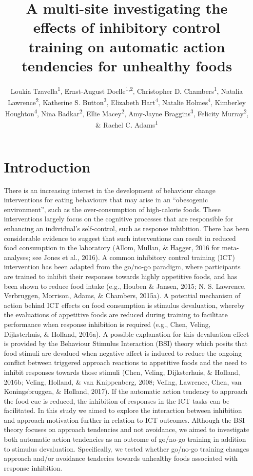 \documentclass[man,floatsintext]{apa6}
\title{A multi-site investigating the effects of inhibitory control training on
automatic action tendencies for unhealthy foods}
\author{Loukia Tzavella\textsuperscript{1}, Ernst-August
Doelle\textsuperscript{1,2}, Christopher D. Chambers\textsuperscript{1},
Natalia Lawrence\textsuperscript{2}, Katherine S.
Button\textsuperscript{3}, Elizabeth Hart\textsuperscript{4}, Natalie
Holmes\textsuperscript{4}, Kimberley Houghton\textsuperscript{4}, Nina
Badkar\textsuperscript{2}, Ellie Macey\textsuperscript{2}, Amy-Jayne
Braggins\textsuperscript{3}, Felicity Murray\textsuperscript{2}, \&
Rachel C. Adams\textsuperscript{1}}
\date{}
\affiliation{
\vspace{0.5cm}
\textsuperscript{1} Cardiff University Brain Research Imaging Centre, CF24 4HQ, UK\\\textsuperscript{2} School of Psychology, University of Exeter, EX4 4QG, UK\\\textsuperscript{3} Department of Psychology, University of Bath, BS2 7AY, UK\\\textsuperscript{4} School of Psychology, Cardiff University, CF10 3AT, UK}
\begin{document}
\maketitle

\section{Introduction}\label{introduction}

\par

There is an increasing interest in the development of behaviour change
interventions for eating behaviours that may arise in an
\enquote{obesogenic environment}, such as the over-consumption of
high-calorie foods. These interventions largely focus on the cognitive
processes that are responsible for enhancing an individual's
self-control, such as response inhibition. There has been considerable
evidence to suggest that such interventions can result in reduced food
consumption in the laboratory (Allom, Mullan, \& Hagger, 2016 for
meta-analyses; see Jones et al., 2016). A common inhibitory control
training (ICT) intervention has been adapted from the go/no-go paradigm,
where participants are trained to inhibit their responses towards highly
appetitive foods, and has been shown to reduce food intake (e.g., Houben
\& Jansen, 2015; N. S. Lawrence, Verbruggen, Morrison, Adams, \&
Chambers, 2015a). A potential mechanism of action behind ICT effects on
food consumption is stimulus devaluation, whereby the evaluations of
appetitive foods are reduced during training to facilitate performance
when response inhibition is required (e.g., Chen, Veling, Dijksterhuis,
\& Holland, 2016a). A possible explanation for this devaluation effect
is provided by the Behaviour Stimulus Interaction (BSI) theory which
posits that food stimuli are devalued when negative affect is induced to
reduce the ongoing conflict between triggered approach reactions to
appetitive foods and the need to inhibit responses towards those stimuli
(Chen, Veling, Dijksterhuis, \& Holland, 2016b; Veling, Holland, \& van
Knippenberg, 2008; Veling, Lawrence, Chen, van Koningsbruggen, \&
Holland, 2017). If the automatic action tendency to approach the food
cue is reduced, the inhibition of responses in the ICT tasks can be
facilitated. In this study we aimed to explore the interaction between
inhibition and approach motivation further in relation to ICT outcomes.
Although the BSI theory focuses on approach tendencies and not
avoidance, we aimed to investigate both automatic action tendencies as
an outcome of go/no-go training in addition to stimulus devaluation.
Specifically, we tested whether go/no-go training changes approach
and/or avoidance tendecies towards unhealthy foods associated with
response inhibition.
\end{document}
